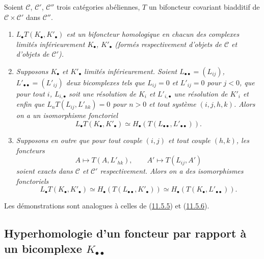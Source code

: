 \begin{proposition}[11.6.5]
\label{0.11.6.5-fr}
Soient $\mathcal C$, $\mathcal C'$, $\mathcal C''$ trois catégories
abéliennes, $T$ un bifoncteur covariant biadditif de
$\mathcal C\times\mathcal C'$ dans $\mathcal C''$.
\begin{enumerate}
\item[{\rm(i)}] \emph{$L_\bullet T(K_\bullet,K'_\bullet)$ est un bifoncteur
homologique en chacun des complexes limités inférieurement $K_\bullet$,
$K'_\bullet$ (formés respectivement d'objets de $\mathcal C$ et d'objets de
$\mathcal C'$).}
\item[{\rm(ii)}] \emph{Supposons $K_\bullet$ et $K'_\bullet$ limités
inférieurement. Soient $L_{\bullet\bullet}=(L_{ij})$,
$L'_{\bullet\bullet}=(L'_{ij})$ deux bicomplexes tels que $L_{ij}=0$ et
$L'_{ij}=0$ pour $j<0$, que pour tout $i$, $L_{i,\bullet}$ soit une
résolution de $K_i$ et $L'_{i,\bullet}$ une résolution de $K'_i$ et enfin que
$L_nT(L_{ij},L'_{hk})=0$ pour $n>0$ et tout système $(i,j,h,k)$. Alors on a
un isomorphisme fonctoriel}
\[
\label{0.11.6.5.1-fr}
\tag{11.6.5.1}
L_\bullet T(K_\bullet,K'_\bullet)
\simeq H_\bullet(T(L_{\bullet\bullet},L'_{\bullet\bullet})).
\]
\item[{\rm(iii)}] \emph{Supposons en outre que pour tout couple $(i,j)$ et
tout couple $(h,k)$, les foncteurs
\[
A\longmapsto T(A,L'_{hk}),\qquad
A'\longmapsto T(L_{ij},A')
\]
soient exacts dans $\mathcal C$ et $\mathcal C'$ respectivement. Alors on a
des isomorphismes fonctoriels}
\[
\label{0.11.6.5.2-fr}
\tag{11.6.5.2}
L_\bullet T(K_\bullet,K'_\bullet)
\simeq H_\bullet(T(L_{\bullet\bullet},K'_\bullet))
\simeq H_\bullet(T(K_\bullet,L'_{\bullet\bullet})).
\]
\end{enumerate}
Les démonstrations sont analogues à celles de
(\hyperref[0.11.5.5-fr]{11.5.5}) et (\hyperref[0.11.5.6-fr]{11.5.6}).
\end{proposition}

\subsection{Hyperhomologie d'un foncteur par rapport à un bicomplexe
$K_{\bullet\bullet}$}
\label{subsection:0.11.7-fr}

